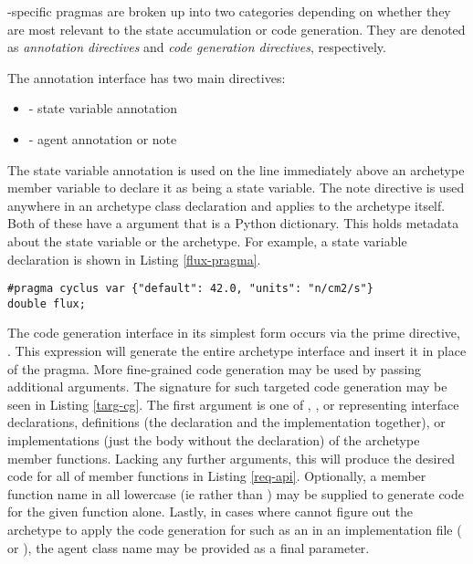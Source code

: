 \cyclus-specific pragmas are broken up into two categories depending on whether 
they are most relevant to the state accumulation or code generation. They 
are denoted as \emph{annotation directives} and \emph{code generation directives},
respectively.

The \cycpp annotation interface has two main directives:
\begin{itemize}
    \item {} - state variable annotation
    \item {} - agent annotation or note
\end{itemize}
The state variable annotation is used on the line immediately above an archetype
member variable to declare it as being a state variable. The note directive is used
anywhere in an archetype class declaration and applies to the archetype itself.
Both of these have a  argument that is a Python dictionary. This 
holds metadata about the state variable or the archetype. For example, a 
state variable declaration is shown in Listing \ref{flux-pragma}.

\begin{lstlisting}[caption={Flux State Variable Annotation}, label=flux-pragma]
#pragma cyclus var {"default": 42.0, "units": "n/cm2/s"}
double flux;
\end{lstlisting}

The code generation interface in its simplest form occurs via the \cyclus 
prime directive, .  This expression will 
generate the entire archetype interface and insert it in place of the pragma.
More fine-grained code generation may be used by passing additional arguments.
The signature for such targeted code generation may be seen in Listing \ref{targ-cg}.
The first argument is one of , , or  representing 
interface declarations, definitions (the declaration and the implementation together), 
or implementations (just the body without the declaration) of the archetype member
functions. Lacking any further arguments, this will produce the desired code for 
all of member functions in Listing \ref{req-api}.  Optionally, a member function 
name in all lowercase (ie  rather than ) may 
be supplied to generate code for the given function alone.  Lastly, in 
cases where \cycpp cannot figure out the archetype to apply the code generation for
such as an in an implementation file ( or ), the agent
class name may be provided as a final parameter.

